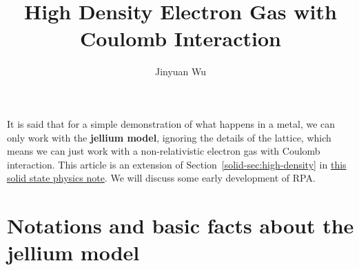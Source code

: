 \documentclass[hyperref, a4paper]{article}
\title{High Density Electron Gas with Coulomb Interaction}
\author{Jinyuan Wu}
\newcommand*{\concept}[1]{{\textbf{#1}}}
\newcommand{\soliddoc}{\href{../solid/solid.pdf}{this solid state physics note}}
\begin{document}
\maketitle

It is said that for a simple demonstration of what happens in a metal, we can only work with the \concept{jellium model},
ignoring the details of the lattice, which means we can just work with a non-relativistic electron gas with Coulomb
interaction.  This article is an extension of Section~\ref{solid-sec:high-density} in \soliddoc. We will discuss some early development of RPA.

\section{Notations and basic facts about the jellium model} 
\end{document}
